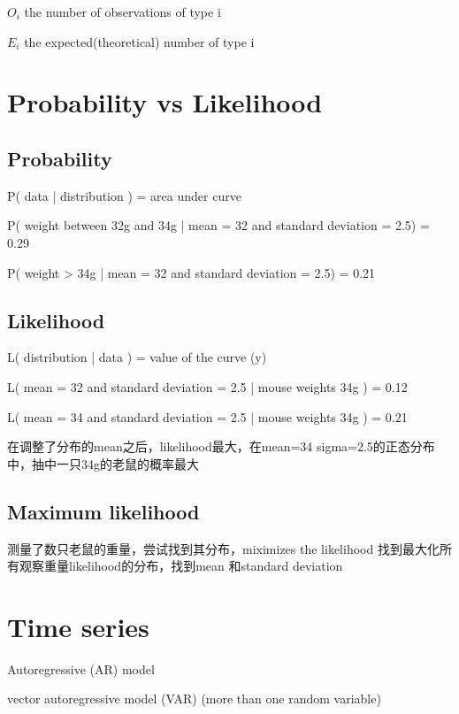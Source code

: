 \documentclass[11pt]{article}
\begin{document}
\begin{list}{-}{}
    \item $O_i$ the number of observations of type i
    \item $E_i$ the expected(theoretical) number of type i
\end{list}

\section{Probability vs Likelihood}

\subsection{Probability}

P( data | distribution ) = area under curve

P( weight between 32g and 34g | mean = 32 and standard deviation = 2.5) = 0.29

P( weight > 34g | mean = 32 and standard deviation = 2.5) = 0.21

\subsection{Likelihood}

L( distribution | data ) = value of the curve (y)

L( mean = 32 and standard deviation = 2.5 | mouse weights 34g ) = 0.12

L( mean = 34 and standard deviation = 2.5 | mouse weights 34g ) = 0.21

在调整了分布的mean之后，likelihood最大，在mean=34 sigma=2.5的正态分布中，抽中一只34g的老鼠的概率最大

\subsection{Maximum likelihood}

测量了数只老鼠的重量，尝试找到其分布，miximizes the likelihood 找到最大化所有观察重量likelihood的分布，找到mean 和standard deviation


\section{Time series}

Autoregressive (AR) model

vector autoregressive model (VAR) (more than one random variable)
\end{document}
